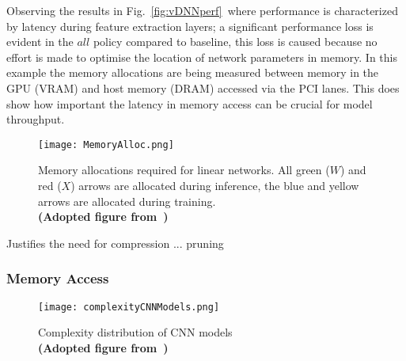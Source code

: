 \documentclass[../../D1.tex]{subfiles}
\begin{document}
Observing the results in Fig.~\ref{fig:vDNNperf}~where performance is characterized by latency during feature extraction layers; a significant performance loss is evident in the $all$ policy compared to baseline, this loss is caused because no effort is made to optimise the location of network parameters in memory.
In this example the memory allocations are being measured between memory in the GPU (VRAM) and host memory (DRAM) accessed via the PCI lanes. This does show how important the latency in memory access can be crucial for model throughput.

\begin{figure}[H]
    \texttt{[image: MemoryAlloc.png]} 
    \caption{Memory allocations required for linear networks. All green ($W$) and red ($X$) arrows are allocated during inference, the blue and yellow arrows are allocated during training.\\ \textbf{(Adopted figure from~\autocite{rhuVDNNVirtualizedDeep2016})}}
    \label{fig:memAllocInf}   
\end{figure}


Justifies the need for compression ... pruning


\subsubsection{Memory Access}

\begin{figure}[H]
    \begin{center}
        \texttt{[image: complexityCNNModels.png]} 
    \end{center}
    
    \caption{Complexity distribution of CNN models\\ \textbf{(Adopted figure from~\autocite{qiuGoingDeeperEmbedded2016})}}
    \label{fig:CNNcomplexity}   
\end{figure}
\end{document}
